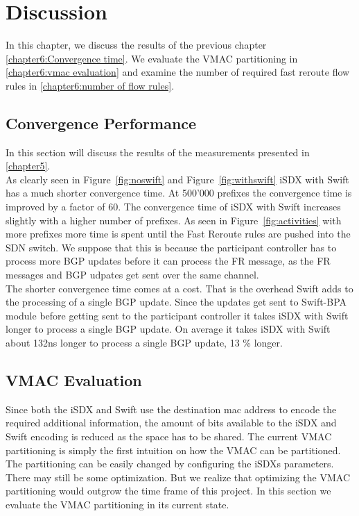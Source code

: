 \chapter{\label{chapter6}Discussion}


In this chapter, we discuss the results of the previous chapter \ref{chapter6:Convergence time}. We evaluate the VMAC partitioning in \ref{chapter6:vmac evaluation} and examine the number of required fast reroute flow rules in \ref{chapter6:number of flow rules}.

\section{\label{chapter6:Convergence time}Convergence Performance}

In this section will discuss the results of the measurements presented in \ref{chapter5}. \\
As clearly seen in Figure~\ref{fig:noswift} and Figure~\ref{fig:withswift} iSDX with Swift has a much shorter convergence time. At 500'000 prefixes the convergence time is improved by a factor of 60. The convergence time of iSDX with Swift increases slightly with a higher number of prefixes. As seen in Figure~\ref{fig:activities} with more prefixes more time is spent until the Fast Reroute rules are pushed into the SDN switch. We suppose that this is because the participant controller has to process more BGP updates before it can process the FR message, as the FR messages and BGP udpates get sent over the same channel. \\
The shorter convergence time comes at a cost. That is the overhead Swift adds to the processing of a single BGP update. Since the updates get sent to Swift-BPA module before getting sent to the participant controller it takes iSDX with Swift longer to process a single BGP update. On average it takes iSDX with Swift about 132ns longer to process a single BGP update, 13 \% longer. 


\section{\label{chapter6:vmac evaluation}VMAC Evaluation}

Since both the iSDX and Swift use the destination mac address to encode the required additional information, the amount of bits available to the iSDX and Swift encoding is reduced as the space has to be shared. The current VMAC partitioning is simply the first intuition on how the VMAC can be partitioned. The partitioning can be easily changed by configuring the iSDXs parameters. There may still be some optimization. But we realize that optimizing the VMAC partitioning would outgrow the time frame of this project. In this section we evaluate the VMAC partitioning in its current state.

